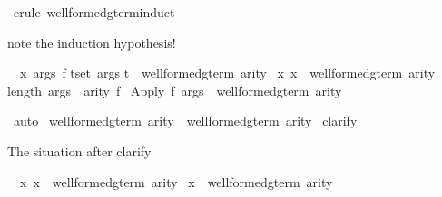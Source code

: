\begin{isabellebody}
\isamarkupfalse%
\ {\isacharparenleft}erule\ well{\isacharunderscore}formed{\isacharunderscore}gterm{\isachardot}induct{\isacharparenright}%
\begin{isamarkuptxt}%
note the induction hypothesis!
\begin{isabelle}%
\ {}{\isachardot}\ {\isasymAnd}x\ args\ f{\isachardot}\isanewline
{}t{\isasymin}set\ args{\isachardot}\isanewline
{}t\ {\isasymin}\ well{\isacharunderscore}formed{\isacharunderscore}gterm\ arity\ {\isasyminter}\isanewline
{}x{\isachardot}\ x\ {\isasymin}\ well{\isacharunderscore}formed{\isacharunderscore}gterm{\isacharprime}\ arity{\isacharbraceright}{\isacharsemicolon}\isanewline
{}length\ args\ {\isacharequal}\ arity\ f{\isasymrbrakk}\isanewline
{}\ Apply\ f\ args\ {\isasymin}\ well{\isacharunderscore}formed{\isacharunderscore}gterm{\isacharprime}\ arity%
\end{isabelle}%
\end{isamarkuptxt}%
\isamarkuptrue%
\isamarkupfalse%
\ auto\isanewline
{}\isamarkupfalse%
%
\endisatagproof
{\isafoldproof}%
%
\isadelimproof
\isanewline
%
\endisadelimproof
\isanewline
\isanewline
\isanewline
{}\isamarkupfalse%
\ {\isachardoublequoteopen}well{\isacharunderscore}formed{\isacharunderscore}gterm{\isacharprime}\ arity\ {\isasymsubseteq}\ well{\isacharunderscore}formed{\isacharunderscore}gterm\ arity{\isachardoublequoteclose}\isanewline
%
\isadelimproof
%
\endisadelimproof
%
\isatagproof
{}\isamarkupfalse%
\ clarify%
\begin{isamarkuptxt}%
The situation after clarify
\begin{isabelle}%
\ {}{\isachardot}\ {\isasymAnd}x{\isachardot}\ x\ {\isasymin}\ well{\isacharunderscore}formed{\isacharunderscore}gterm{\isacharprime}\ arity\ {\isasymLongrightarrow}\isanewline
{}x\ {\isasymin}\ well{\isacharunderscore}formed{\isacharunderscore}gterm\ arity%
\end{isabelle}%
\end{isamarkuptxt}%
\isamarkuptrue%
\isamarkupfalse%

\end{isabellebody}
